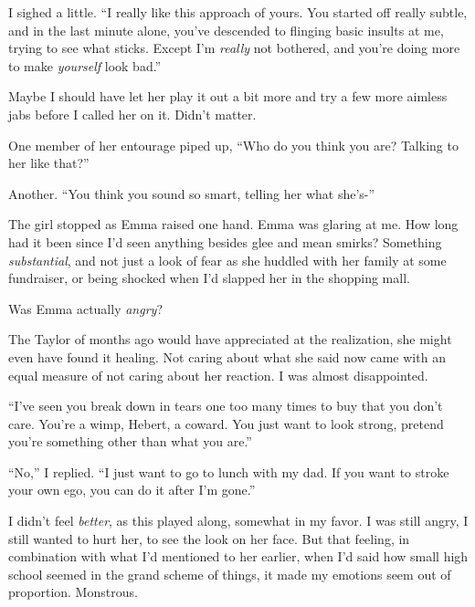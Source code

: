 I sighed a little.  ``I really like this approach of yours.  You started off really subtle, and in the last minute alone, you've descended to flinging basic insults at me, trying to see what sticks.  Except I'm \emph{really} not bothered, and you're doing more to make \emph{yourself} look bad.''



Maybe I should have let her play it out a bit more and try a few more aimless jabs before I called her on it.  Didn't matter.



One member of her entourage piped up, ``Who do you think you are?  Talking to her like that?''



Another.  ``You think you sound so smart, telling her what she's-''



The girl stopped as Emma raised one hand.  Emma was glaring at me.  How long had it been since I'd seen anything besides glee and mean smirks?  Something \emph{substantial}, and not just a look of fear as she huddled with her family at some fundraiser, or being shocked when I'd slapped her in the shopping mall.



Was Emma actually \emph{angry}?



The Taylor of months ago would have appreciated at the realization, she might even have found it healing.  Not caring about what she said now came with an equal measure of not caring about her reaction.  I was almost disappointed.



``I've seen you break down in tears one too many times to buy that you don't care.  You're a wimp, Hebert, a coward.  You just want to look strong, pretend you're something other than what you are.''



``No,'' I replied.  ``I just want to go to lunch with my dad.  If you want to stroke your own ego, you can do it after I'm gone.''



I didn't feel \emph{better}, as this played along, somewhat in my favor.  I was still angry, I still wanted to hurt her, to see the look on her face.  But that feeling, in combination with what I'd mentioned to her earlier, when I'd said how small high school seemed in the grand scheme of things, it made my emotions seem out of proportion.  Monstrous.



